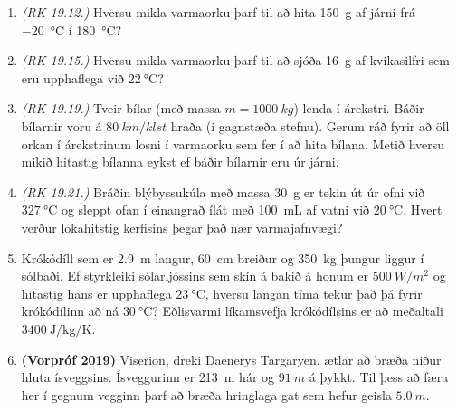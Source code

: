 \begin{enumerate}[label = \textbf{Dæmi \thechapter.\arabic*.}]


\item \textit{(RK 19.12.)} Hversu mikla varmaorku þarf til að hita \SI{150}{g} af járni frá \SI{-20}{\celsius} í \SI{180}{\celsius}?


\item \textit{(RK 19.15.)} Hversu mikla varmaorku þarf til að sjóða \SI{16}{g} af kvikasilfri sem eru upphaflega við $\SI{22}{\celsius}$?

\item \textit{(RK 19.19.)} Tveir bílar (með massa $m = \SI{1000}{kg}$) lenda í árekstri. Báðir bílarnir voru á $\SI{80}{km/klst}$ hraða (í gagnstæða stefnu). Gerum ráð fyrir að öll orkan í árekstrinum losni í varmaorku sem fer í að hita bílana. Metið hversu mikið hitastig bílanna eykst ef báðir bílarnir eru úr járni.

\item \textit{(RK 19.21.)} Bráðin blýbyssukúla með massa \SI{30}{g} er tekin út úr ofni við $\SI{327}{\celsius}$ og sleppt ofan í einangrað ílát með \SI{100}{mL} af vatni við $\SI{20}{\celsius}$. Hvert verður lokahitstig kerfisins þegar það nær varmajafnvægi?

\item Krókódíll sem er \SI{2.9}{m} langur, \SI{60}{cm} breiður og \SI{350}{kg} þungur liggur í sólbaði. Ef styrkleiki sólarljóssins sem skín á bakið á honum er $\SI{500}{W/m^2}$ og hitastig hans er upphaflega $\SI{23}{\celsius}$, hversu langan tíma tekur það þá fyrir krókódílinn að ná $\SI{30}{\celsius}$? Eðlisvarmi líkamsvefja krókódílsins er að meðaltali $\SI{3400}{\joule\per\kilogram\per\kelvin}$.

\item \textbf{(Vorpróf 2019)} Viserion, dreki Daenerys Targaryen, ætlar að bræða niður hluta ísveggsins. Ísveggurinn er \SI{213}{m} hár og $\SI{91}{m}$ á þykkt. Til þess að færa her í gegnum vegginn þarf að bræða hringlaga gat sem hefur geisla $\SI{5.0}{m}$.
\end{enumerate}
